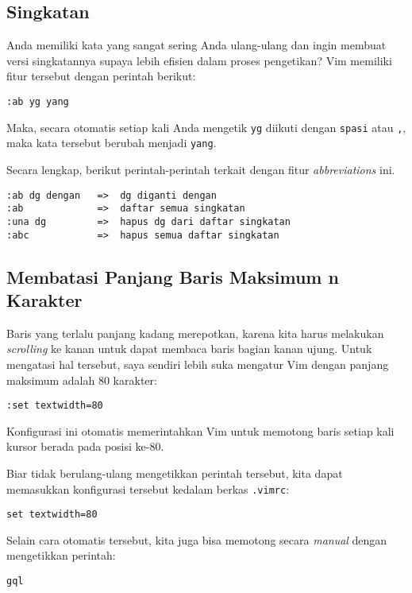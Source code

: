 \documentclass{article}
\begin{document}
\subsection{Singkatan}
Anda memiliki kata yang sangat sering Anda ulang-ulang dan
ingin membuat versi singkatannya supaya lebih efisien dalam
proses pengetikan? Vim memiliki fitur tersebut dengan
perintah berikut:

\begin{verbatim}
:ab yg yang
\end{verbatim}

Maka, secara otomatis setiap kali Anda mengetik \verb=yg=
diikuti dengan \verb=spasi= atau \verb=,=, maka kata
tersebut berubah menjadi \verb=yang=.

Secara lengkap, berikut perintah-perintah terkait dengan
fitur \emph{abbreviations} ini.

\begin{verbatim}
:ab dg dengan   =>  dg diganti dengan
:ab             =>  daftar semua singkatan
:una dg         =>  hapus dg dari daftar singkatan
:abc            =>  hapus semua daftar singkatan
\end{verbatim}

\subsection{Membatasi Panjang Baris Maksimum n Karakter}
Baris yang terlalu panjang kadang merepotkan, karena kita
harus melakukan \emph{scrolling} ke kanan untuk dapat
membaca baris bagian kanan ujung. Untuk mengatasi hal
tersebut, saya sendiri lebih suka mengatur Vim dengan
panjang maksimum adalah 80 karakter:

\begin{verbatim}
:set textwidth=80
\end{verbatim}

Konfigurasi ini otomatis memerintahkan Vim untuk memotong
baris setiap kali kursor berada pada posisi ke-80.

Biar tidak berulang-ulang mengetikkan perintah tersebut,
kita dapat memasukkan konfigurasi tersebut kedalam berkas
\verb=.vimrc=:

\begin{verbatim}
set textwidth=80
\end{verbatim}

Selain cara otomatis tersebut, kita juga bisa memotong
secara \emph{manual} dengan mengetikkan perintah:

\begin{verbatim}
gql
\end{verbatim}
\end{document}
